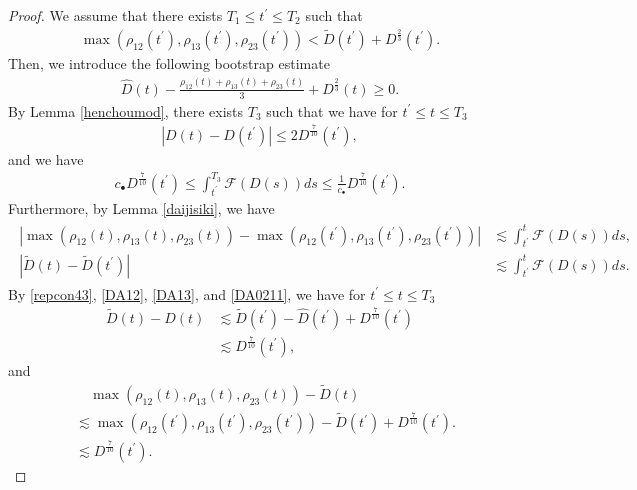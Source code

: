 \documentclass[reqno]{amsart}
\theoremstyle{plain}
\theoremstyle{definition}
\numberwithin{equation}{section}
\newcommand{\1}{\mathbbm{1}}
\begin{document}
\begin{proof}
We assume that there exists $T_1\leq t^{\prime}\leq T_2$ such that 
\begin{align}\label{DA11}
\max{(\rho_{12}(t^{\prime}),\rho_{13}(t^{\prime}),\rho_{23}(t^{\prime}))}<\tilde{D}(t^{\prime})+D^{\frac{2}{3}}(t^{\prime}).
\end{align} 
Then, we introduce the following bootstrap estimate
\begin{align}\label{bsass}
\hat{D}(t)-\frac{\rho_{12}(t)+\rho_{13}(t)+\rho_{23}(t)}{3}+D^{\frac{2}{3}}(t)\geq 0.
\end{align}
By Lemma \ref{henchoumod}, there exists $T_3$ such that we have for $t^{\prime}\leq t\leq T_3$
\begin{align}\label{DA12}
|D(t)-D(t^{\prime})|\leq 2D^{\frac{7}{10}}(t^{\prime}),
\end{align}
and we have
\begin{align}\label{DA13}
c_{\bullet} D^{\frac{7}{10}}(t^{\prime})\leq \int_{t^{\prime}}^{T_3}\mathcal{F}(D(s))ds\leq \frac{1}{c_{\bullet}} D^{\frac{7}{10}}(t^{\prime}).
\end{align}
Furthermore, by Lemma \ref{daijisiki}, we have
\begin{align}\label{DA0211}
\begin{aligned}
\left|\max{(\rho_{12}(t),\rho_{13}(t),\rho_{23}(t))}-\max{(\rho_{12}(t^{\prime}),\rho_{13}(t^{\prime}),\rho_{23}(t^{\prime}))}\right|&\lesssim \int_{t^{\prime}}^{t}\mathcal{F}(D(s))ds,
\\
\left|\tilde{D}(t)-\tilde{D}(t^{\prime})\right|&\lesssim\int_{t^{\prime}}^{t}\mathcal{F}(D(s))ds.
\end{aligned}
\end{align}
By \eqref{repcon43}, \eqref{DA12}, \eqref{DA13}, and \eqref{DA0211}, we have for $t^{\prime}\leq t\leq T_3$
\begin{align*}
\tilde{D}(t)-\hat{D}(t)&\lesssim \tilde{D}(t^{\prime})-\hat{D}(t^{\prime})+D^{\frac{7}{10}}(t^{\prime})
\\
&\lesssim D^{\frac{7}{10}}(t^{\prime}),
\end{align*}
and
\begin{align*}
&\quad \max{(\rho_{12}(t),\rho_{13}(t),\rho_{23}(t))}-\tilde{D}(t)
\\
&\lesssim \max{(\rho_{12}(t^{\prime}),\rho_{13}(t^{\prime}),\rho_{23}(t^{\prime}))}-\tilde{D}(t^{\prime})+D^{\frac{7}{10}}(t^{\prime}).
\\
&\lesssim D^{\frac{7}{10}}(t^{\prime}).
\end{align*}

\end{proof}
\end{document}
